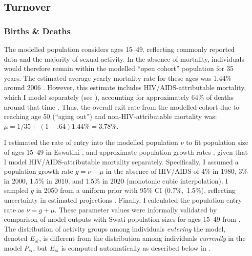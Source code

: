 \subsection{Turnover}\label{model.par.turnover}
\subsubsection{Births \& Deaths}\label{model.par.turnover.bd}
The modelled population considers ages 15--49,
reflecting commonly reported data and the majority of sexual activity.
In the absence of mortality, individuals would therefore
remain within the modelled ``open cohort'' population for 35 years.
The estimated average yearly mortality rate for these ages was 1.44\% around 2006
\cite[Table~15.2]{SDHS2006}.
However, this estimate includes HIV/AIDS-attributable mortality,
which I model separately (see ),
accounting for approximately 64\% of deaths around that time \cite{WHO2006EswMort}.
Thus, the overall exit rate from the modelled cohort
due to reaching age 50 (``aging out'') and non-HIV-attributable mortality was:
$\mu = 1/35 + (1-.64) 1.44\% = 3.78\%$.
\par
I estimated the rate of entry into the modelled population $\nu$
to fit population size of ages 15--49 in Eswatini \cite{WorldBank},
and approximate population growth rates \cite{UNWPP2019},
given that I model HIV/AIDS-attributable mortality separately.
Specifically, I assumed a population growth rate $g = \nu - \mu$ in the absence of HIV/AIDS of
4\% in 1980, 3\% in 2000, 1.5\% in 2010, and 1.5\% in 2020 (monotonic cubic interpolation).
I sampled $g$ in 2050 from a uniform prior with 95\% CI (0.7\%,~1.5\%),
reflecting uncertainty in estimated projections \cite{UNWPP2019}.
Finally, I calculated the population entry rate as $\nu = g + \mu$.
These parameter values were informally validated by comparison of model outputs with
Swati population sizes for ages 15--49 from \cite{WorldBank}.
The distribution of activity groups among individuals \emph{entering} the model, denoted $E_{si}$,
is different from the distribution among individuals \emph{currently} in the model $P_{si}$,
but $E_{si}$ is computed automatically as described below in .

